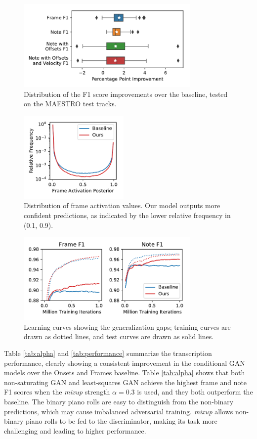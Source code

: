 \begin{figure}[t]
	\centering
	\includegraphics[height=12em]{pertrack.pdf}
	\caption{Distribution of the F1 score improvements over the baseline, tested on the MAESTRO test tracks.}\label{fig:pertrack}
\end{figure}
\begin{figure}[t]
	\centering
	\includegraphics[height=12em]{distribution.pdf}
	\caption{Distribution of frame activation values. Our model outputs more confident predictions, as indicated by the lower relative frequency in (0.1, 0.9).}\label{fig:distribution}
\end{figure}
\begin{figure}[t]
	\centering
	\includegraphics[height=12em]{training.pdf}
	\caption{Learning curves showing the generalization gaps; training curves are drawn as dotted lines, and test curves are drawn as solid lines.}\label{fig:training}
\end{figure}

Table \ref{tab:alpha} and \ref{tab:performance} summarize the transcription performance, clearly showing a consistent improvement in the conditional GAN models over the Onsets and Frames baseline.
Table \ref{tab:alpha} shows that both non-saturating GAN and least-squares GAN achieve the highest frame and note F1 scores when the \textit{mixup} strength $\alpha = 0.3$ is used, and they both outperform the baseline.
The binary piano rolls are easy to distinguish from the non-binary predictions, which may cause imbalanced adversarial training. \textit{mixup} allows non-binary piano rolls to be fed to the discriminator, making its task more challenging and leading to higher performance.

